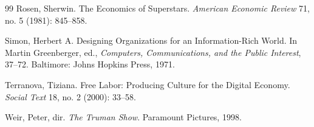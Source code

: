 \documentclass[12pt]{article}
\theoremstyle{plain}
\theoremstyle{definition}
\begin{document}
\begin{thebibliography}{99}
Rosen, Sherwin.
The Economics of Superstars.
\textit{American Economic Review} 71, no. 5 (1981): 845--858.

Simon, Herbert A.
Designing Organizations for an Information-Rich World.
In Martin Greenberger, ed.,
\textit{Computers, Communications, and the Public Interest},
37--72.
Baltimore: Johns Hopkins Press, 1971.

Terranova, Tiziana.
Free Labor: Producing Culture for the Digital Economy.
\textit{Social Text} 18, no. 2 (2000): 33--58.

Weir, Peter, dir.
\textit{The Truman Show}.
Paramount Pictures, 1998.

\end{thebibliography}
\end{document}
